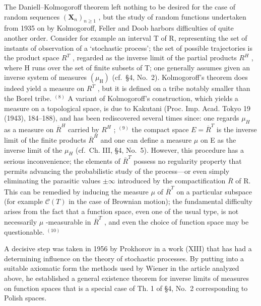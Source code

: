 The Daniell--Kolmogoroff theorem left nothing to be desired for the case of random sequences \((\mathbf{X}_{n})_{n\geqslant1}\) , but the study of random functions undertaken from 1935 on by Kolmogoroff, Feller and Doob harbors difficulties of quite another order. Consider for example an interval T of R, representing the set of instants of observation of a `stochastic process'; the set of possible trajectories is the product space \(R^{T}\) , regarded as the inverse limit of the partial products \(R^{H}\) , where H runs over the set of finite subsets of T; one generally assumes given an inverse system of measures \((\mu_{\mathrm{H}})\) (cf.~§4, No.~2). Kolmogoroff's theorem does indeed yield a measure on \(R^{T}\) , but it is defined on a tribe notably smaller than the Borel tribe. \(^{(8)}\) A variant of Kolmogoroff's construction, which yields a measure on a topological space, is due to Kakutani (Proc. Imp. Acad. Tokyo 19 (1943), 184--188), and has been rediscovered several times since: one regards \(\mu_{H}\) as a measure on \(\overline{R}^{H}\) carried by \(R^{H}\) ; \(^{(9)}\) the compact space \(E = \overline{R}^{T}\) is the inverse limit of the finite products \(\overline{R}^{H}\) and one can define a measure \(\mu\) on E as the inverse limit of the \(\mu_{H}\) (cf.~Ch. III, §4, No.~5). However, this procedure has a serious inconvenience; the elements of \(\overline{R}^{T}\) possess no regularity property that permits advancing the probabilistic study of the process---or even simply eliminating the parasitic values \(\pm\infty\) introduced by the compactification \(\overline{R}\) of R. This can be remedied by inducing the measure \(\mu\) of \(\overline{R}^{T}\) on a particular subspace (for example \(\mathcal{C}(T)\) in the case of Brownian motion); the fundamental difficulty arises from the fact that a function space, even one of the usual type, is not necessarily \(\mu\) -measurable in \(\overline{R}^{T}\) , and even the choice of function space may be questionable. \(^{(10)}\)

A decisive step was taken in 1956 by Prokhorov in a work (XIII) that has had a determining influence on the theory of stochastic processes. By putting into a suitable axiomatic form the methods used by Wiener in the article analyzed above, he established a general existence theorem for inverse limits of measures on function spaces that is a special case of Th. 1 of §4, No.~2 corresponding to Polish spaces.

